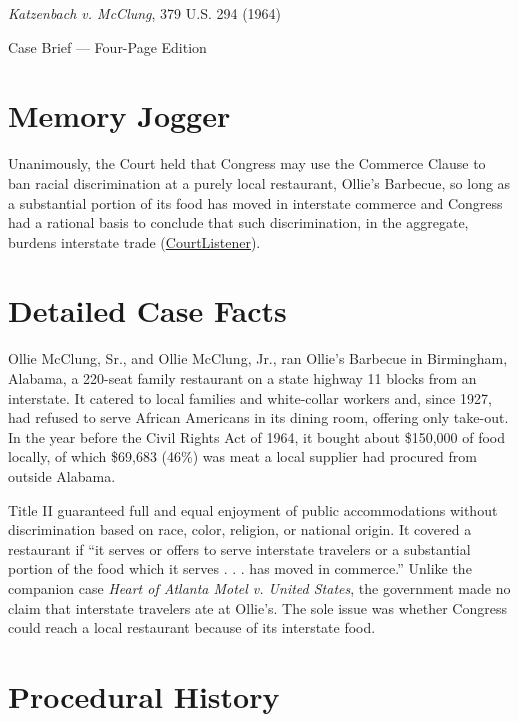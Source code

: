 \documentclass[12pt]{article}
\begin{document}
\begin{center}
{\LARGE \textit{Katzenbach v. McClung}, 379 U.S. 294 (1964)\par}
\vspace{0.8em}
{\large Case Brief --- Four-Page Edition\par}
\end{center}
\vspace{1em}

\section{Memory Jogger}

Unanimously, the Court held that Congress may use the Commerce Clause to ban racial discrimination at a purely local restaurant, Ollie's Barbecue, so long as a substantial portion of its food has moved in interstate commerce and Congress had a rational basis to conclude that such discrimination, in the aggregate, burdens interstate trade (\href{https://www.courtlistener.com/opinion/106951/katzenbach-v-mcclung/}{CourtListener}).

\section{Detailed Case Facts}

Ollie McClung, Sr., and Ollie McClung, Jr., ran Ollie's Barbecue in Birmingham, Alabama, a 220-seat family restaurant on a state highway 11 blocks from an interstate. It catered to local families and white-collar workers and, since 1927, had refused to serve African Americans in its dining room, offering only take-out. In the year before the Civil Rights Act of 1964, it bought about \$150,000 of food locally, of which \$69,683 (46\%) was meat a local supplier had procured from outside Alabama.

Title II guaranteed full and equal enjoyment of public accommodations without discrimination based on race, color, religion, or national origin. It covered a restaurant if ``it serves or offers to serve interstate travelers or a substantial portion of the food which it serves . . . has moved in commerce.'' Unlike the companion case \textit{Heart of Atlanta Motel v. United States}, the government made no claim that interstate travelers ate at Ollie's. The sole issue was whether Congress could reach a local restaurant because of its interstate food.

\section{Procedural History}
\end{document}
